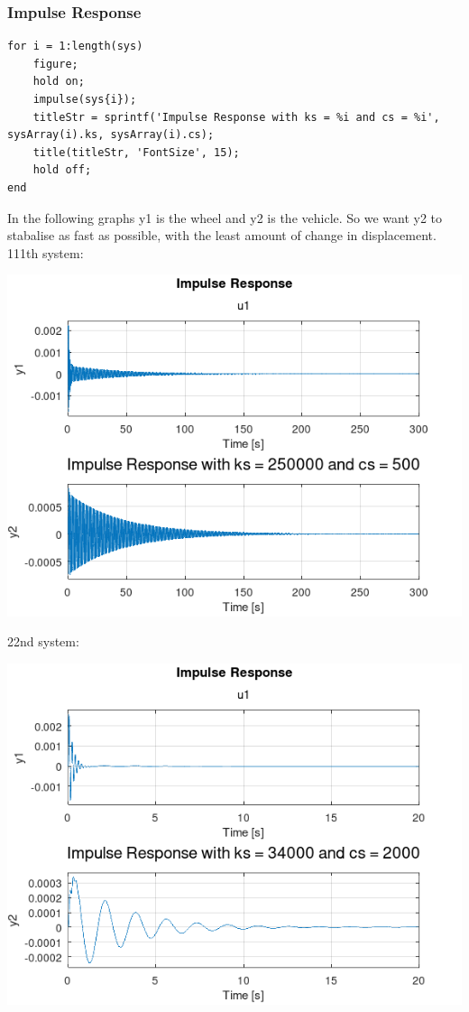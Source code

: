 \documentclass[11pt]{article}
\begin{document}
\subsubsection{Impulse Response}
\label{sec:orge1b9b37}
\begin{verbatim}
for i = 1:length(sys)
    figure;
    hold on;
    impulse(sys{i});
    titleStr = sprintf('Impulse Response with ks = %i and cs = %i', sysArray(i).ks, sysArray(i).cs);
    title(titleStr, 'FontSize', 15);
    hold off;
end
\end{verbatim}
In the following graphs y1 is the wheel and y2 is the vehicle. So we want y2 to stabalise as fast as possible, with the least amount of change in displacement.
111th system:
\begin{center}
\includegraphics[width=.9\linewidth]{ENG204-Assignment-2-Impulse-Response-111.png}
\end{center}
22nd system:
\begin{center}
\includegraphics[width=.9\linewidth]{ENG204-Assignment-2-Impulse-Response-22.png}
\end{center}
\end{document}
